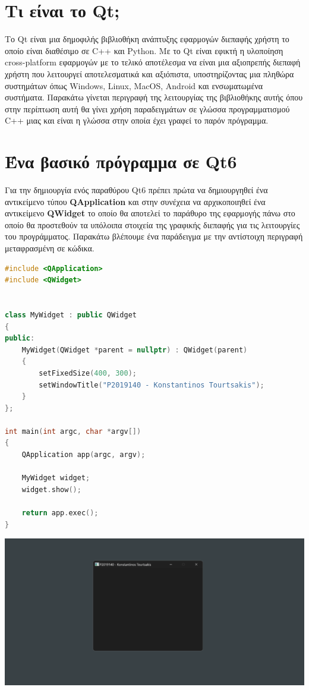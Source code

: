 




\section{Τι είναι το Qt;}
Το Qt είναι μια δημοφιλής βιβλιοθήκη ανάπτυξης εφαρμογών διεπαφής χρήστη το
οποίο είναι διαθέσιμο σε C++ και Python. Με το Qt
είναι εφικτή η υλοποίηση cross-platform εφαρμογών με το τελικό αποτέλεσμα
να είναι μια αξιοπρεπής διεπαφή χρήστη που λειτουργεί αποτελεσματικά και
αξιόπιστα, υποστηρίζοντας μια πληθώρα συστημάτων όπως Windows, Linux, MacOS, Android και ενσωματωμένα συστήματα. 
Παρακάτω γίνεται περιγραφή της λειτουργίας της βιβλιοθήκης αυτής όπου στην 
περίπτωση αυτή θα γίνει χρήση παραδειγμάτων σε γλώσσα προγραμματισμού C++ 
μιας και είναι η γλώσσα στην οποία έχει γραφεί το παρόν πρόγραμμα.

\section{Ένα βασικό πρόγραμμα σε Qt6}
Για την δημιουργία ενός παραθύρου Qt6 πρέπει πρώτα να δημιουργηθεί ένα αντικείμενο
τύπου \textbf{QApplication} και στην συνέχεια να αρχικοποιηθεί ένα αντικείμενο 
\textbf{QWidget} το οποίο θα αποτελεί το παράθυρο της εφαρμογής πάνω στο
οποίο θα προστεθούν τα υπόλοιπα στοιχεία της γραφικής διεπαφής για τις λειτουργίες
του προγράμματος. Παρακάτω βλέπουμε ένα παράδειγμα με την αντίστοιχη περιγραφή
μεταφρασμένη σε κώδικα.

\begin{lstlisting}[language=C++, style=cppstyle]
#include <QApplication>
#include <QWidget>


class MyWidget : public QWidget 
{
public:
    MyWidget(QWidget *parent = nullptr) : QWidget(parent) 
    {
        setFixedSize(400, 300);
        setWindowTitle("P2019140 - Konstantinos Tourtsakis");
    }
};

int main(int argc, char *argv[]) 
{
    QApplication app(argc, argv);

    MyWidget widget;
    widget.show();

    return app.exec();
}

\end{lstlisting}

\includegraphics[width=1.0\textwidth]{./images/simple_qt6_app.png}

